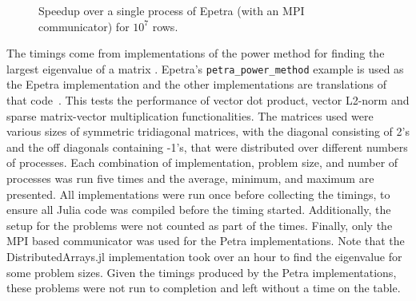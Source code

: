 \documentclass[acmsmall]{acmart}
\begin{document}
	\begin{figure}
		\centering
		\caption{Speedup over a single process of Epetra (with an MPI communicator) for \(10^7\) rows.}
		\label{fig:result-numProcs}
	\end{figure}

	The timings come from implementations of the power method for finding the largest eigenvalue of a matrix
	\cite{Gu:2000:PowerMethod}.
	Epetra's \texttt{petra\_power\_method} example is used as the Epetra implementation and the other implementations are translations of that code~\cite{Heroux:2005:Trilinos}.
	This tests the performance of vector dot product, vector L2-norm and sparse matrix-vector multiplication functionalities.
	The matrices used were various sizes of symmetric tridiagonal matrices, with the diagonal consisting of 2's
	and the off diagonals containing -1's, that were distributed over different numbers of processes.
	Each combination of implementation, problem size, and number of processes was run five times and the average, minimum, and maximum are presented.
	All implementations were run once before collecting the timings, to ensure all Julia code was
	compiled before the timing started.
	Additionally, the setup for the problems were not counted as part of the times.
	Finally, only the MPI based communicator was used for the Petra implementations.
	Note that the DistributedArrays.jl implementation took over an hour to find the eigenvalue for some problem sizes.
	Given the timings produced by the Petra implementations, these problems were not run to completion and left without a time on the table.
	
\end{document}

